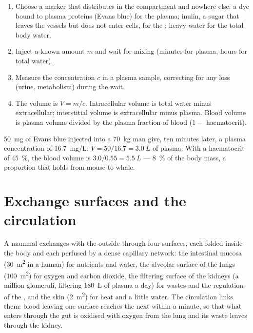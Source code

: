 \begin{method}\label{met:b1:mammal-organization:dilution}
\begin{enumerate}
  \item Choose a marker that distributes in the compartment and
        nowhere else: a dye bound to plasma proteins (Evans blue) for
        the plasma; inulin, a sugar that leaves the vessels but does
        not enter cells, for the ; heavy water for
        the total body water.
  \item Inject a known amount $m$ and wait for mixing (minutes for
        plasma, hours for total water).
  \item Measure the concentration $c$ in a plasma sample, correcting
        for any loss (urine, metabolism) during the wait.
  \item The volume is $V = m/c$. Intracellular volume is total water
        minus extracellular; interstitial volume is extracellular minus
        plasma. Blood volume is plasma volume divided by the plasma
        fraction of blood ($1 - $ haematocrit).
\end{enumerate}
\end{method}

\begin{example}\label{ex:b1:mammal-organization:evansblue}
\qty{50}{mg} of Evans blue injected into a \qty{70}{kg} man give,
ten minutes later, a plasma concentration of \qty{16.7}{mg/L}:
$V = 50/16.7 = \qty{3.0}{L}$ of plasma. With a haematocrit of
\qty{45}{\%}, the blood volume is $3.0/0.55 = \qty{5.5}{L}$ ---
\qty{8}{\%} of the body mass, a proportion that holds from mouse to
whale.
\end{example}

\section{Exchange surfaces and the circulation}

\begin{proposition}\label{prop:b1:mammal-organization:surfaces}
A mammal exchanges with the outside through four surfaces, each folded
inside the body and each perfused by a dense capillary network: the
intestinal mucosa (\qty{30}{m^2} in a human) for nutrients and water,
the alveolar surface of the lungs (\qty{100}{m^2}) for oxygen and
carbon dioxide, the filtering surface of the kidneys (a million
glomeruli, filtering \qty{180}{L} of plasma a day) for wastes and the
regulation of the , and the skin (\qty{2}{m^2}) for
heat and a little water. The circulation links them: blood leaving one
surface reaches the next within a minute, so that what enters through
the gut is oxidised with oxygen from the lung and its waste leaves
through the kidney.
\end{proposition}

